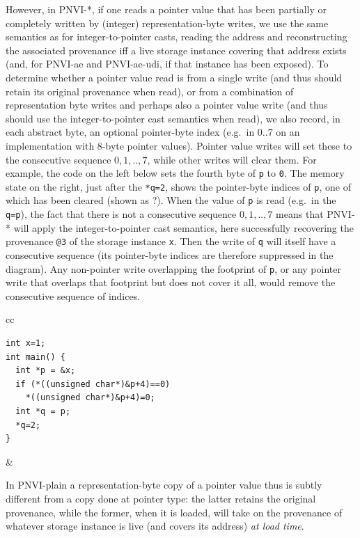 \documentclass[acmsmall,review,screen]{acmart}\settopmatter{printfolios=true,printccs=false,printacmref=false}
\begin{document}
However, in PNVI-*,
if one reads a pointer value that has been partially or completely
written by (integer) representation-byte writes, we use the same
semantics as for integer-to-pointer casts, reading the address and
reconstructing the associated provenance iff a live storage
instance covering that address exists (and, for PNVI-ae and
PNVI-ae-udi, if that instance has been exposed).
%
To determine whether a pointer value read is from a single write (and
thus should retain its original provenance when read), or from a combination of
representation byte writes and perhaps also a pointer value write (and
thus should use the integer-to-pointer cast semantics when read),
we also record, in each abstract byte, an optional pointer-byte index
(e.g.~in $0..7$ on an implementation with 8-byte pointer values). 
Pointer value writes will set these to the consecutive sequence
$0,1,..,7$, while other writes will clear them. 
%
For example, the code on the left below sets the fourth byte of
\lstinline{p} to \lstinline{0}. The memory state on the right, just
after the \lstinline{*q=2}, shows the pointer-byte indices of
\lstinline{p}, one of which has been cleared (shown as ?).  When the
value of \lstinline{p} is read (e.g.~in the \lstinline{q=p}), the fact
that there is not a consecutive sequence $0,1,..,7$ means that PNVI-*
will apply the integer-to-pointer cast semantics, here successfully
recovering the provenance \lstinline{@3} of the storage instance
\lstinline{x}.  Then the write of \lstinline{q} will itself have a
consecutive sequence (its pointer-byte indices are therefore
suppressed in the diagram).  Any non-pointer write overlapping the
footprint of \lstinline{p}, or any pointer write that overlaps that
footprint but does not cover it all, would remove the consecutive
sequence of indices.  
\begin{center}
  \begin{tabular}{cc}
{\begin{lstlisting}
int x=1;
int main() {
  int *p = &x;
  if (*((unsigned char*)&p+4)==0)
    *((unsigned char*)&p+4)=0;
  int *q = p;
  *q=2;
}
\end{lstlisting}}
&
  \end{tabular}
  \end{center}
In PNVI-plain a representation-byte copy of a pointer value thus is
subtly different from a copy done at pointer type: the latter retains
the original provenance, while the former, when it is loaded, will
take on the provenance of whatever storage instance is live (and covers
its address) \emph{at load time}.  
\end{document}
